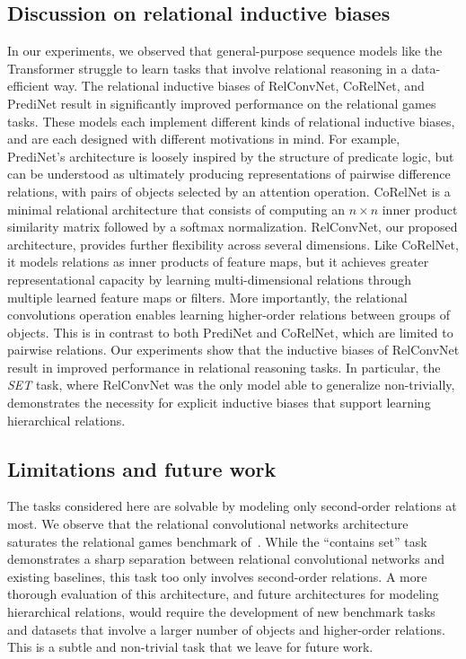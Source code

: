 \subsection*{Discussion on relational inductive biases}
In our experiments, we observed that general-purpose sequence models like the Transformer struggle to learn tasks that involve relational reasoning in a data-efficient way. The relational inductive biases of RelConvNet, CoRelNet, and PrediNet result in significantly improved performance on the relational games tasks. These models each implement different kinds of relational inductive biases, and are each designed with different motivations in mind. For example, PrediNet's architecture is loosely inspired by the structure of predicate logic, but can be understood as ultimately producing representations of pairwise difference relations, with pairs of objects selected by an attention operation. CoRelNet is a minimal relational architecture that consists of computing an $n \times n$ inner product similarity matrix followed by a softmax normalization. RelConvNet, our proposed architecture, provides further flexibility across several dimensions. Like CoRelNet, it models relations as inner products of feature maps, but it achieves greater representational capacity by learning multi-dimensional relations through multiple learned feature maps or filters. More importantly, the relational convolutions operation enables learning higher-order relations between groups of objects. This is in contrast to both PrediNet and CoRelNet, which are limited to pairwise relations. Our experiments show that the inductive biases of RelConvNet result in improved performance in relational reasoning tasks. In particular, the \textit{SET} task, where RelConvNet was the only model able to generalize non-trivially, demonstrates the necessity for explicit inductive biases that support learning hierarchical relations.

\subsection*{Limitations and future work}
The tasks considered here are solvable by modeling only second-order relations at most. We observe that the relational convolutional networks architecture saturates the relational games benchmark of~\citet{shanahanExplicitlyRelationalNeural}. While the ``contains set'' task demonstrates a sharp separation between relational convolutional networks and existing baselines, this task too only involves second-order relations.
A more thorough evaluation of this architecture, and future architectures for modeling hierarchical relations, would require the development of new benchmark tasks and datasets that involve a larger number of objects and higher-order relations. This is a subtle and non-trivial task that we leave for future work.

